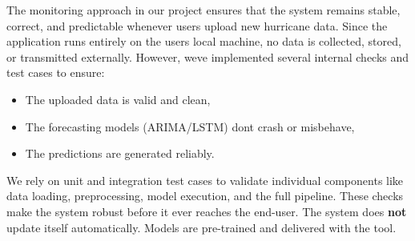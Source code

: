 The monitoring approach in our project ensures that the system remains stable, correct, and predictable whenever users upload new hurricane data. Since the application runs entirely on the user\textquotesingle{}s local machine, no data is collected, stored, or transmitted externally. However, we\textquotesingle ve implemented several internal checks and test cases to ensure:
\begin{itemize}
	\item The uploaded data is valid and clean,
	\item The forecasting models (ARIMA/LSTM) don\textquotesingle t crash or misbehave,
	\item The predictions are generated reliably.
\end{itemize}

\begin{center}
\end{center}


We rely on unit and integration test cases to validate individual components like data loading, preprocessing, model execution, and the full pipeline. These checks make the system robust before it ever reaches the end-user. The system does \textbf{not} update itself automatically. Models are pre-trained and delivered with the tool.

